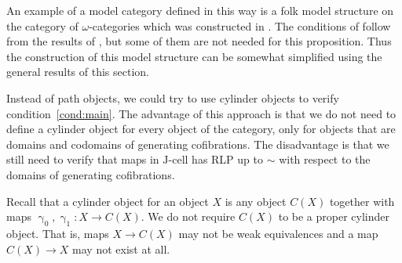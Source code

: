 \documentclass{tac}
\theoremstyle{definition}
\newcommand{\I}{\mathrm{I}}
\newcommand{\J}{\mathrm{J}}
\newcommand{\class}[2]{#1\text{-}\mathrm{#2}}
\newcommand{\Icell}[1][\I]{\class{#1}{cell}}
\newcommand{\Jcell}[1][]{\Icell[\J#1]}
\newcommand{\cyli}{\upgamma}
\begin{document}
\begin{exmp}
An example of a model category defined in this way is a folk model structure on the category of $\omega$-categories which was constructed in \cite{folk}.
The conditions of  follow from the results of \cite{folk}, but some of them are not needed for this proposition.
Thus the construction of this model structure can be somewhat simplified using the general results of this section.
\end{exmp}

Instead of path objects, we could try to use cylinder objects to verify condition~\eqref{cond:main}.
The advantage of this approach is that we do not need to define a cylinder object for every object of the category,
only for objects that are domains and codomains of generating cofibrations.
The disadvantage is that we still need to verify that maps in $\Jcell$ has RLP up to $\sim$ with respect to the domains of generating cofibrations.

Recall that a cylinder object for an object $X$ is any object $C(X)$ together with maps $\cyli_0,\cyli_1 : X \to C(X)$.
We do not require $C(X)$ to be a proper cylinder object.
That is, maps $X \to C(X)$ may not be weak equivalences and a map $C(X) \to X$ may not exist at all.
\end{document}
